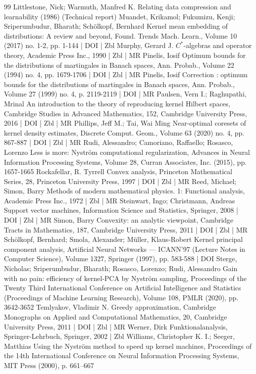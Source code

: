 \begin{thebibliography}{99}
Littlestone, Nick; Warmuth, Manfred K. Relating data compression and learnability (1986) (Technical report)
Muandet, Krikamol; Fukumizu, Kenji; Sriperumbudur, Bharath; Schölkopf, Bernhard Kernel mean embedding of distributions: A review and beyond, Found. Trends Mach. Learn., Volume 10 (2017) no. 1-2, pp. 1-144 | DOI | Zbl
Murphy, Gerard J. ${C}^*$-algebras and operator theory, Academic Press Inc., 1990 | Zbl | MR
Pinelis, Iosif Optimum bounds for the distributions of martingales in Banach spaces, Ann. Probab., Volume 22 (1994) no. 4, pp. 1679-1706 | DOI | Zbl | MR
Pinelis, Iosif Correction : optimum bounds for the distributions of martingales in Banach spaces, Ann. Probab., Volume 27 (1999) no. 4, p. 2119-2119 | DOI | MR
Paulsen, Vern I.; Raghupathi, Mrinal An introduction to the theory of reproducing kernel Hilbert spaces, Cambridge Studies in Advanced Mathematics, 152, Cambridge University Press, 2016 | DOI | Zbl | MR
Phillips, Jeff M.; Tai, Wai Ming Near-optimal coresets of kernel density estimates, Discrete Comput. Geom., Volume 63 (2020) no. 4, pp. 867-887 | DOI | Zbl | MR
Rudi, Alessandro; Camoriano, Raffaello; Rosasco, Lorenzo Less is more: Nyström computational regularization, Advances in Neural Information Processing Systems, Volume 28, Curran Associates, Inc. (2015), pp. 1657-1665
Rockafellar, R. Tyrrell Convex analysis, Princeton Mathematical Series, 28, Princeton University Press, 1997 | DOI | Zbl | MR
Reed, Michael; Simon, Barry Methods of modern mathematical physics. 1: Functional analysis, Academic Press Inc., 1972 | Zbl | MR
Steinwart, Ingo; Christmann, Andreas Support vector machines, Information Science and Statistics, Springer, 2008 | DOI | Zbl | MR
Simon, Barry Convexity: an analytic viewpoint, Cambridge Tracts in Mathematics, 187, Cambridge University Press, 2011 | DOI | Zbl | MR
Schölkopf, Bernhard; Smola, Alexander; Müller, Klaus-Robert Kernel principal component analysis, Artificial Neural Networks — ICANN’97 (Lecture Notes in Computer Science), Volume 1327, Springer (1997), pp. 583-588 | DOI
Sterge, Nicholas; Sriperumbudur, Bharath; Rosasco, Lorenzo; Rudi, Alessandro Gain with no pain: efficiency of kernel-PCA by Nyström sampling, Proceedings of the Twenty Third International Conference on Artificial Intelligence and Statistics (Proceedings of Machine Learning Research), Volume 108, PMLR (2020), pp. 3642-3652
Temlyakov, Vladimir N. Greedy approximation, Cambridge Monographs on Applied and Computational Mathematics, 20, Cambridge University Press, 2011 | DOI | Zbl | MR
Werner, Dirk Funktionalanalysis, Springer-Lehrbuch, Springer, 2002 | Zbl
Williams, Christopher K. I.; Seeger, Matthias Using the Nyström method to speed up kernel machines, Proceedings of the 14th International Conference on Neural Information Processing Systems, MIT Press (2000), p. 661–667
\end{thebibliography}
